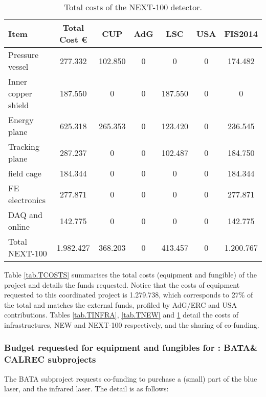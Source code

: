 \begin{table}[h!]
\begin{center}
\begin{tabular}{|l|c|c|c|c|c|c|}
\hline
 Item & Total Cost \euro & CUP	&AdG &	LSC & USA &	FIS2014 \\
 \hline
 Pressure vessel &	 277.332 & 	 102.850 & 	 0 & 	 0 & 	 0 & 	 174.482 \\ 
Inner copper shield &	 187.550 & 	 0 & 	 0 & 	 187.550 & 	 0 & 	 0 \\ 
Energy plane	& 625.318 & 	 265.353 & 	 0 & 	 123.420 & 	 0 & 	 236.545 \\ 
Tracking plane	&  287.237 & 	 0 & 	 0 & 	 102.487 & 	 0 & 	 184.750 \\ 
field cage	 & 184.344 & 	 0 & 	 0 & 	 0 & 	 0 & 	 184.344 \\ 
FE electronics	& 277.871 & 	 0 & 	 0 & 	 0 & 	 0 & 	 277.871 \\
DAQ and online &	 142.775 & 	 0 & 	 0 & 	 0 & 	 0 & 	 142.775 \\ 
Total NEXT-100	 & 1.982.427 & 	 368.203 & 	 0 & 	 413.457 & 	 0 & 	 1.200.767 \\ 
  \hline\hline
\end{tabular}  
\caption{Total costs of the NEXT-100 detector.}
\label{tab.TN100}
\end{center}
\end{table} 
 
Table \ref{tab.TCOSTS} summarises the total costs (equipment and fungible) of the project and details the funds requested. Notice that the costs of equipment requested to this coordinated project is 1.279.738, which corresponds to 27\% of the total and matches the external funds, profiled by AdG/ERC and USA contributions. 
Tables \ref{tab.TINFRA},  \ref{tab.TNEW} and  \ref{tab.TN100} detail the costs of infrastructures, NEW and NEXT-100 respectively, and the sharing of co-funding. 

\subsubsection*{Budget requested for equipment and fungibles for \BATA: BATA\& CALREC subprojects}

The BATA subproject requests co-funding to purchase a (small) part of the blue laser, and the infrared laser. The detail is as follows:


